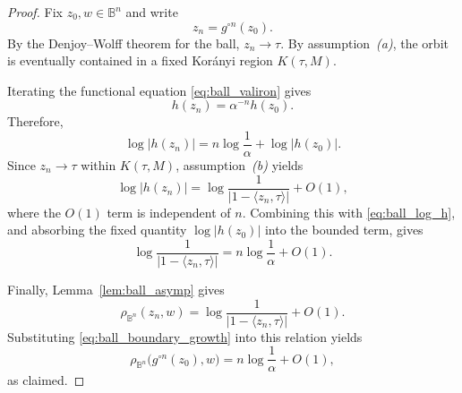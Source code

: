 \documentclass[10pt,a4paper]{amsart}
\numberwithin{equation}{section}
\begin{document}
\begin{proof}
Fix $z_0,w\in\mathbb B^n$ and write
\begin{equation*}
z_n=g^{\circ n}(z_0).
\end{equation*}
By the Denjoy--Wolff theorem for the ball,
$z_n\to\tau$. By assumption~\emph{(a)}, the orbit is eventually contained
in a fixed Kor\'anyi region $K(\tau,M)$.

Iterating the functional equation \eqref{eq:ball_valiron} gives
\begin{equation*}
\label{eq:ball_valiron_iterates}
h(z_n)
=
\alpha^{-n}h(z_0).
\end{equation*}
Therefore,
\begin{equation}
\label{eq:ball_log_h}
\log|h(z_n)|
=
n\log\frac1\alpha
+
\log|h(z_0)|.
\end{equation}
Since $z_n\to\tau$ within $K(\tau,M)$, assumption~\emph{(b)} yields
\begin{equation*}
\log|h(z_n)|
=
\log\frac{1}{|1-\langle z_n,\tau\rangle|}
+
O(1),
\end{equation*}
where the $O(1)$ term is independent of $n$. Combining this with
\eqref{eq:ball_log_h}, and absorbing the fixed quantity
$\log|h(z_0)|$ into the bounded term, gives
\begin{equation}
\label{eq:ball_boundary_growth}
\log\frac{1}{|1-\langle z_n,\tau\rangle|}
=
n\log\frac1\alpha
+
O(1).
\end{equation}

Finally, Lemma~\ref{lem:ball_asymp} gives
\begin{equation*}
\rho_{\mathbb B^n}(z_n,w)
=
\log\frac{1}{|1-\langle z_n,\tau\rangle|}
+
O(1).
\end{equation*}
Substituting \eqref{eq:ball_boundary_growth} into this relation yields
\begin{equation*}
\rho_{\mathbb B^n}
\bigl(g^{\circ n}(z_0),w\bigr)
=
n\log\frac1\alpha
+
O(1),
\end{equation*}
as claimed.
\end{proof}
\end{document}
